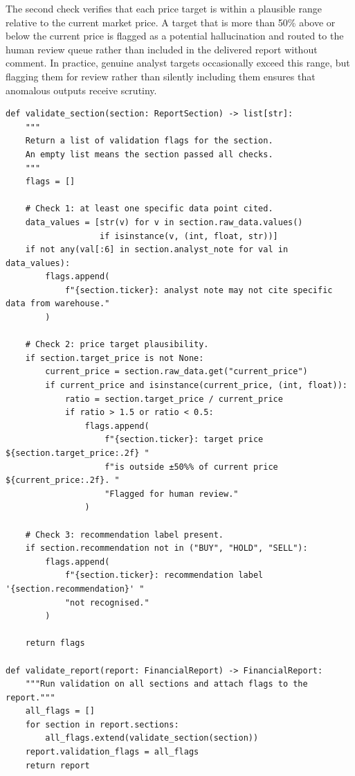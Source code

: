 The second check verifies that each price target is within a plausible range relative
to the current market price. A target that is more than 50\% above or below the current
price is flagged as a potential hallucination and routed to the human review queue
rather than included in the delivered report without comment. In practice, genuine
analyst targets occasionally exceed this range, but flagging them for review rather
than silently including them ensures that anomalous outputs receive scrutiny.

\begin{verbatim}
def validate_section(section: ReportSection) -> list[str]:
    """
    Return a list of validation flags for the section.
    An empty list means the section passed all checks.
    """
    flags = []

    # Check 1: at least one specific data point cited.
    data_values = [str(v) for v in section.raw_data.values()
                   if isinstance(v, (int, float, str))]
    if not any(val[:6] in section.analyst_note for val in data_values):
        flags.append(
            f"{section.ticker}: analyst note may not cite specific data from warehouse."
        )

    # Check 2: price target plausibility.
    if section.target_price is not None:
        current_price = section.raw_data.get("current_price")
        if current_price and isinstance(current_price, (int, float)):
            ratio = section.target_price / current_price
            if ratio > 1.5 or ratio < 0.5:
                flags.append(
                    f"{section.ticker}: target price ${section.target_price:.2f} "
                    f"is outside ±50%% of current price ${current_price:.2f}. "
                    "Flagged for human review."
                )

    # Check 3: recommendation label present.
    if section.recommendation not in ("BUY", "HOLD", "SELL"):
        flags.append(
            f"{section.ticker}: recommendation label '{section.recommendation}' "
            "not recognised."
        )

    return flags

def validate_report(report: FinancialReport) -> FinancialReport:
    """Run validation on all sections and attach flags to the report."""
    all_flags = []
    for section in report.sections:
        all_flags.extend(validate_section(section))
    report.validation_flags = all_flags
    return report
\end{verbatim}

